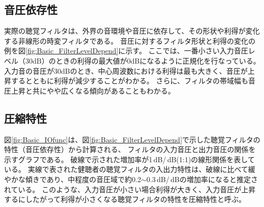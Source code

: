 

\newpage
\subsection{音圧依存性}
\label{sec:FilterLevelDepend}
実際の聴覚フィルタは、外界の音環境や音圧に依存して、その形状や利得が変化する非線形の時変フィルタである。
音圧に対するフィルタ形状と利得の変化の例を図\ref{fig:Basic_FilterLevelDepend}に示す。
ここでは、一番小さい入力音圧レベル（30dB）のときの利得の最大値が0dBになるように正規化を行なっている。
入力音の音圧が30dBのとき、中心周波数における利得は最も大きく、音圧が上昇するとともに利得が減少することがわかる。
さらに、フィルタの帯域幅も音圧上昇と共にやや広くなる傾向があることもわかる。
    
\subsection{圧縮特性}
\label{sec:IOfunc}
図\ref{fig:Basic_IOfunc}は、図\ref{fig:Basic_FilterLevelDepend}で示した聴覚フィルタの特性（音圧依存性）から計算される、
フィルタの入力音圧と出力音圧の関係を示すグラフである。
破線で示された増加率が1\,dB/\,dB(1:1)の線形関係を表している。
実線で表された健聴者の聴覚フィルタの入出力特性は、破線に比べて緩やかな傾きであり、中程度の音圧域で約0.2$\sim$0.3\,dB/\,dBの増加率になると推定されている。
このような、入力音圧が小さい場合利得が大きく、入力音圧が上昇するにしたがって利得が小さくなる聴覚フィルタの特性を圧縮特性と呼ぶ。

